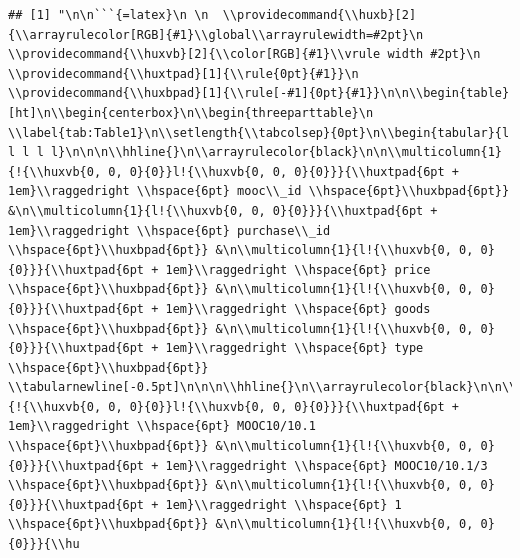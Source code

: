\documentclass[11pt,preprint, authoryear]{elsarticle}
\let\origtable\table
\let\endorigtable\endtable
\renewenvironment{table}[1][2] {
    \expandafter\origtable\expandafter[H]
} {
    \endorigtable
}
\numberwithin{equation}{section}
\numberwithin{figure}{section}
\numberwithin{table}{section}
\begin{document}
\begin{verbatim}
## [1] "\n\n```{=latex}\n \n  \\providecommand{\\huxb}[2]{\\arrayrulecolor[RGB]{#1}\\global\\arrayrulewidth=#2pt}\n  \\providecommand{\\huxvb}[2]{\\color[RGB]{#1}\\vrule width #2pt}\n  \\providecommand{\\huxtpad}[1]{\\rule{0pt}{#1}}\n  \\providecommand{\\huxbpad}[1]{\\rule[-#1]{0pt}{#1}}\n\n\\begin{table}[ht]\n\\begin{centerbox}\n\\begin{threeparttable}\n \\label{tab:Table1}\n\\setlength{\\tabcolsep}{0pt}\n\\begin{tabular}{l l l l l}\n\n\n\\hhline{}\n\\arrayrulecolor{black}\n\n\\multicolumn{1}{!{\\huxvb{0, 0, 0}{0}}l!{\\huxvb{0, 0, 0}{0}}}{\\huxtpad{6pt + 1em}\\raggedright \\hspace{6pt} mooc\\_id \\hspace{6pt}\\huxbpad{6pt}} &\n\\multicolumn{1}{l!{\\huxvb{0, 0, 0}{0}}}{\\huxtpad{6pt + 1em}\\raggedright \\hspace{6pt} purchase\\_id \\hspace{6pt}\\huxbpad{6pt}} &\n\\multicolumn{1}{l!{\\huxvb{0, 0, 0}{0}}}{\\huxtpad{6pt + 1em}\\raggedright \\hspace{6pt} price \\hspace{6pt}\\huxbpad{6pt}} &\n\\multicolumn{1}{l!{\\huxvb{0, 0, 0}{0}}}{\\huxtpad{6pt + 1em}\\raggedright \\hspace{6pt} goods \\hspace{6pt}\\huxbpad{6pt}} &\n\\multicolumn{1}{l!{\\huxvb{0, 0, 0}{0}}}{\\huxtpad{6pt + 1em}\\raggedright \\hspace{6pt} type \\hspace{6pt}\\huxbpad{6pt}} \\tabularnewline[-0.5pt]\n\n\n\\hhline{}\n\\arrayrulecolor{black}\n\n\\multicolumn{1}{!{\\huxvb{0, 0, 0}{0}}l!{\\huxvb{0, 0, 0}{0}}}{\\huxtpad{6pt + 1em}\\raggedright \\hspace{6pt} MOOC10/10.1 \\hspace{6pt}\\huxbpad{6pt}} &\n\\multicolumn{1}{l!{\\huxvb{0, 0, 0}{0}}}{\\huxtpad{6pt + 1em}\\raggedright \\hspace{6pt} MOOC10/10.1/3 \\hspace{6pt}\\huxbpad{6pt}} &\n\\multicolumn{1}{l!{\\huxvb{0, 0, 0}{0}}}{\\huxtpad{6pt + 1em}\\raggedright \\hspace{6pt} 1 \\hspace{6pt}\\huxbpad{6pt}} &\n\\multicolumn{1}{l!{\\huxvb{0, 0, 0}{0}}}{\\hu
\end{verbatim}
\end{document}
